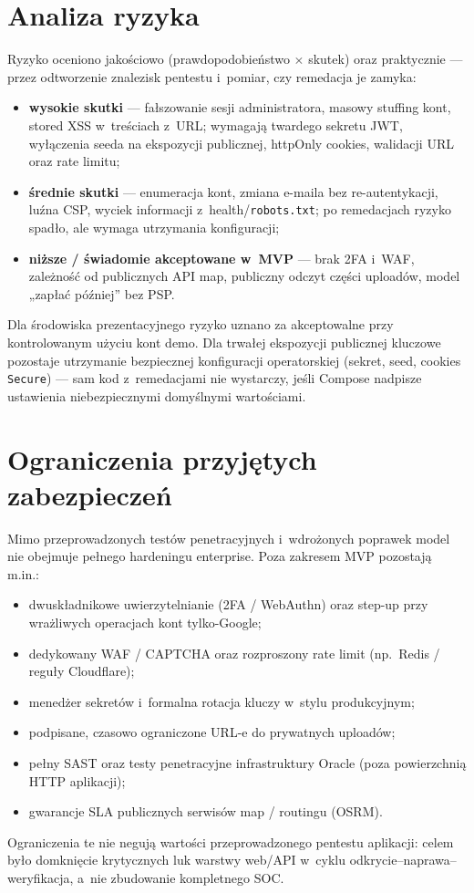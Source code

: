 \documentclass{sprz}
\begin{document}
\section{Analiza ryzyka}
Ryzyko oceniono jakościowo (prawdopodobieństwo $\times$ skutek) oraz praktycznie --- przez odtworzenie znalezisk pentestu i~pomiar, czy remedacja je zamyka:
\begin{itemize}
  \item \textbf{wysokie skutki} --- fałszowanie sesji administratora, masowy stuffing kont, stored XSS w~treściach z~URL; wymagają twardego sekretu JWT, wyłączenia seeda na ekspozycji publicznej, httpOnly cookies, walidacji URL oraz rate limitu;
  \item \textbf{średnie skutki} --- enumeracja kont, zmiana e-maila bez re-autentykacji, luźna CSP, wyciek informacji z~health/\texttt{robots.txt}; po remedacjach ryzyko spadło, ale wymaga utrzymania konfiguracji;
  \item \textbf{niższe / świadomie akceptowane w~MVP} --- brak 2FA i~WAF, zależność od publicznych API map, publiczny odczyt części uploadów, model „zapłać później” bez PSP.
\end{itemize}
Dla środowiska prezentacyjnego ryzyko uznano za akceptowalne przy kontrolowanym użyciu kont demo. Dla trwałej ekspozycji publicznej kluczowe pozostaje utrzymanie bezpiecznej konfiguracji operatorskiej (sekret, seed, cookies \texttt{Secure}) --- sam kod z~remedacjami nie wystarczy, jeśli Compose nadpisze ustawienia niebezpiecznymi domyślnymi wartościami.

\section{Ograniczenia przyjętych zabezpieczeń}
Mimo przeprowadzonych testów penetracyjnych i~wdrożonych poprawek model nie obejmuje pełnego hardeningu enterprise. Poza zakresem MVP pozostają m.in.:
\begin{itemize}
  \item dwuskładnikowe uwierzytelnianie (2FA / WebAuthn) oraz step-up przy wrażliwych operacjach kont tylko-Google;
  \item dedykowany WAF / CAPTCHA oraz rozproszony rate limit (np.\ Redis / reguły Cloudflare);
  \item menedżer sekretów i~formalna rotacja kluczy w~stylu produkcyjnym;
  \item podpisane, czasowo ograniczone URL-e do prywatnych uploadów;
  \item pełny SAST oraz testy penetracyjne infrastruktury Oracle (poza powierzchnią HTTP aplikacji);
  \item gwarancje SLA publicznych serwisów map / routingu (OSRM).
\end{itemize}
Ograniczenia te nie negują wartości przeprowadzonego pentestu aplikacji: celem było domknięcie krytycznych luk warstwy web/API w~cyklu odkrycie--naprawa--weryfikacja, a~nie zbudowanie kompletnego SOC.
\end{document}
